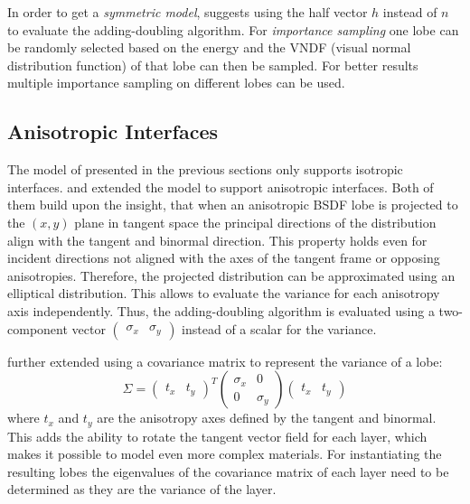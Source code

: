 %

In order to get a \textit{symmetric model}, \textcite{belcour2018} suggests using the half vector $h$ instead of $n$ to evaluate the adding-doubling algorithm. For \textit{importance sampling} one lobe can be randomly selected based on the energy and the VNDF (visual normal distribution function) of that lobe can then be sampled. For better results multiple importance sampling on different lobes can be used.

\subsection{Anisotropic Interfaces}
\label{sec:anisotropic_interfaces}

The model of \textcite{belcour2018} presented in the previous sections only supports isotropic interfaces. \textcite{weier2020} and \textcite{yamaguchi2019} extended the model to support anisotropic interfaces. Both of them build upon the insight, that when an anisotropic BSDF lobe is projected to the $(x,y)$ plane in tangent space the principal directions of the distribution align with the tangent and binormal direction. This property holds even for incident directions not aligned with the axes of the tangent frame or opposing anisotropies. Therefore, the projected distribution can be approximated using an elliptical distribution. This allows to evaluate the variance for each anisotropy axis independently. Thus, the adding-doubling algorithm is evaluated using a two-component vector $\begin{pmatrix}\sigma_x & \sigma_y\end{pmatrix}$ instead of a scalar for the variance. 

%

\textcite{yamaguchi2019} further extended using a covariance matrix to represent the variance of a lobe:
\begin{equation}
    \Sigma = 
    \begin{pmatrix}
        t_x & t_y    
    \end{pmatrix}^T
    \begin{pmatrix}
        \sigma_x & 0\\
        0 & \sigma_y
    \end{pmatrix}
    \begin{pmatrix}
        t_x & t_y    
    \end{pmatrix}
\end{equation}
where $t_x$ and $t_y$ are the anisotropy axes defined by the tangent and binormal. This adds the ability to rotate the tangent vector field for each layer, which makes it possible to model even more complex materials. For instantiating the resulting lobes the eigenvalues of the covariance matrix of each layer need to be determined as they are the variance of the layer.\\

